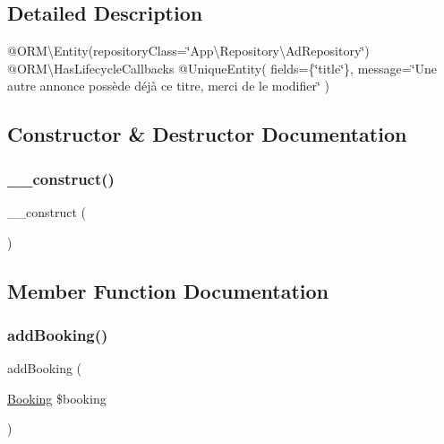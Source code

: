 \subsection{Detailed Description}
@\+O\+RM\textbackslash{}\+Entity(repository\+Class=\char`\"{}\+App\textbackslash{}\+Repository\textbackslash{}\+Ad\+Repository\char`\"{}) @\+O\+RM\textbackslash{}\+Has\+Lifecycle\+Callbacks @\+Unique\+Entity( fields=\{\char`\"{}title\char`\"{}\}, message=\char`\"{}\+Une autre annonce possède déjà ce titre, merci de le modifier\char`\"{} ) 

\subsection{Constructor \& Destructor Documentation}
\mbox{\label{class_app_1_1_entity_1_1_ad_a095c5d389db211932136b53f25f39685}} 
\subsubsection{\texorpdfstring{\_\_construct()}{\_\_construct()}}
{\footnotesize\ttfamily \+\_\+\+\_\+construct (\begin{DoxyParamCaption}{ }\end{DoxyParamCaption})}



\subsection{Member Function Documentation}
\mbox{\label{class_app_1_1_entity_1_1_ad_a843c4ecdcf427fcc51745d213a56ee66}} 
\subsubsection{\texorpdfstring{addBooking()}{addBooking()}}
{\footnotesize\ttfamily add\+Booking (\begin{DoxyParamCaption}\item[{\mbox{\hyperlink{class_app_1_1_entity_1_1_booking}{Booking}}}]{\$booking }\end{DoxyParamCaption})}

\mbox{\label{class_app_1_1_entity_1_1_ad_aa8fd802a5ef6804bc4033103454fb0b6}} 
